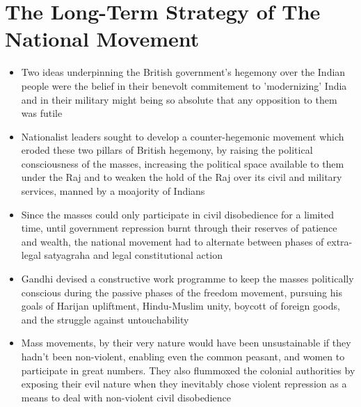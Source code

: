 \section{The Long-Term Strategy of The National Movement}
\begin{itemize}
    \item Two ideas underpinning the British government's hegemony over the Indian people were the belief in their benevolt commitement to 'modernizing' India and in their military might being so absolute that any opposition to them was futile
    \item Nationalist leaders sought to develop a counter-hegemonic movement which eroded these two pillars of British hegemony, by raising the political consciousness of the masses, increasing the political space available to them under the Raj and to weaken the hold of the Raj over its civil and military services, manned by a moajority of Indians
    \item Since the masses could only participate in civil disobedience for a limited time, until government repression burnt through their reserves of patience and wealth, the national movement had to alternate between phases of extra-legal satyagraha and legal constitutional action
    \item Gandhi devised a constructive work programme to keep the masses politically conscious during the passive phases of the freedom movement, pursuing his goals of Harijan upliftment, Hindu-Muslim unity, boycott of foreign goods, and the struggle against untouchability
    \item Mass movements, by their very nature would have been unsustainable if they hadn't been non-violent, enabling even the common peasant, and women to participate in great numbers. They also flummoxed the colonial authorities by exposing their evil nature when they inevitably chose violent repression as a means to deal with non-violent civil disobedience
\end{itemize}

